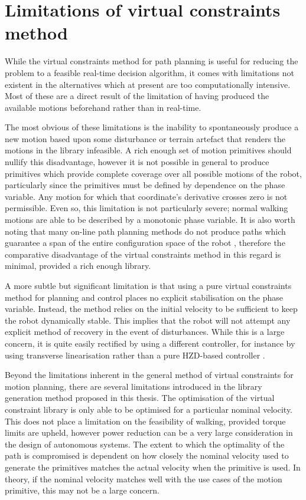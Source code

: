 \section{Limitations of virtual constraints method}
While the virtual constraints method for path planning is useful for reducing the problem to a feasible real-time decision algorithm, it comes with limitations not existent in the alternatives which at present are too computationally intensive. Most of these are a direct result of the limitation of having produced the available motions beforehand rather than in real-time.

The most obvious of these limitations is the inability to spontaneously produce a new motion based upon some disturbance or terrain artefact that renders the motions in the library infeasible. A rich enough set of motion primitives should nullify this disadvantage, however it is not possible in general to produce primitives which provide complete coverage over all possible motions of the robot, particularly since the primitives must be defined by dependence on the phase variable. Any motion for which that coordinate's derivative crosses zero is not permissible. Even so, this limitation is not particularly severe; normal walking motions are able to be described by a monotonic phase variable. It is also worth noting that many on-line path planning methods do not produce paths which guarantee a span of the entire configuration space of the robot \cite{boor1999gaussian, lavalle2001randomized, frazzoli2002real}, therefore the comparative disadvantage of the virtual constraints method in this regard is minimal, provided a rich enough library. 

A more subtle but significant limitation is that using a pure virtual constraints method for planning and control places no explicit stabilisation on the phase variable. Instead, the method relies on the initial velocity to be sufficient to keep the robot dynamically stable. This implies that the robot will not attempt any explicit method of recovery in the event of disturbances. While this is a large concern, it is quite easily rectified by using a different controller, for instance by using transverse linearisation rather than a pure HZD-based controller \cite{manchester2011stable}.

Beyond the limitations inherent in the general method of virtual constraints for motion planning, there are several limitations introduced in the library generation method proposed in this thesis. The optimisation of the virtual constraint library is only able to be optimised for a particular nominal velocity. This does not place a limitation on the feasibility of walking, provided torque limits are upheld, however power reduction can be a very large consideration in the design of autonomous systems. The extent to which the optimality of the path is compromised is dependent on how closely the nominal velocity used to generate the primitives matches the actual velocity when the primitive is used. In theory, if the nominal velocity matches well with the use cases of the motion primitive, this may not be a large concern.

